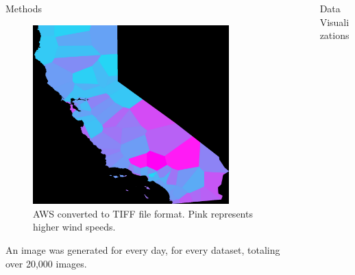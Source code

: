 \documentclass[final]{beamer}
\newlength{\sepwidth}
\newlength{\colwidth}
\newcommand{\separatorcolumn}{\begin{column}{\sepwidth}\end{column}}
\begin{document}
\begin{frame}[t]
\begin{columns}[t]
\begin{column}{\colwidth}
\begin{block}{Methods}
\begin{figure}
\begin{minipage}{0.5\textwidth}
        \includegraphics[width=0.85\textwidth]{images/2DCAwind.png}
        \caption{AWS converted to TIFF file format. Pink represents higher wind speeds.}
        \label{fig:2DCAwind.png}
    \end{minipage}
\end{figure}

    An image was generated for every day, for every dataset, totaling over 20,000 images.

  \end{block}

  
\end{column}

\separatorcolumn

\begin{column}{\colwidth}

  \begin{block}{Data Visualizations}


\end{block}
\end{column}
\end{columns}
\end{frame}
\end{document}
